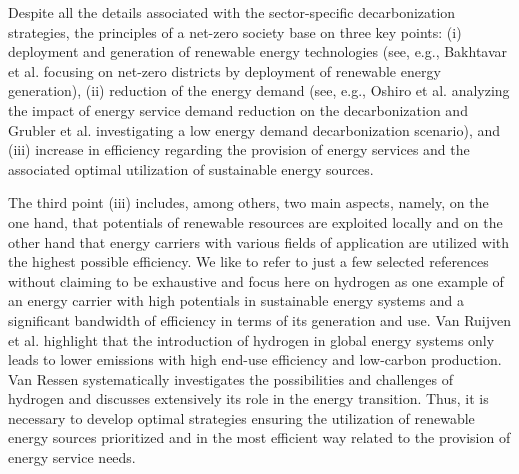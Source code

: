Despite all the details associated with the sector-specific decarbonization strategies, the principles of a net-zero society base on three key points: (i) deployment and generation of renewable energy technologies (see, e.g., Bakhtavar et al. \cite{bakhtavar2020assessment} focusing on net-zero districts by deployment of renewable energy generation), (ii) reduction of the energy demand (see, e.g., Oshiro et al. \cite{oshiro2021enabling} analyzing the impact of energy service demand reduction on the decarbonization and Grubler et al. \cite{grubler2018low} investigating a low energy demand decarbonization scenario), and (iii) increase in efficiency regarding the provision of energy services and the associated optimal utilization of sustainable energy sources. 

The third point (iii) includes, among others, two main aspects, namely, on the one hand, that potentials of renewable resources are exploited locally and on the other hand that energy carriers with various fields of application are utilized with the highest possible efficiency. We like to refer to just a few selected references without claiming to be exhaustive and focus here on hydrogen as one example of an energy carrier with high potentials in sustainable energy systems and a significant bandwidth of efficiency in terms of its generation and use. Van Ruijven et al. \cite{van2007potential} highlight that the introduction of hydrogen in global energy systems only leads to lower emissions with high end-use efficiency and low-carbon production. Van Ressen \cite{van2020hydrogen} systematically investigates the possibilities and challenges of hydrogen and discusses extensively its role in the energy transition.  Thus, it is necessary to develop optimal strategies ensuring the utilization of renewable energy sources prioritized and in the most efficient way related to the provision of energy service needs.\newline 

